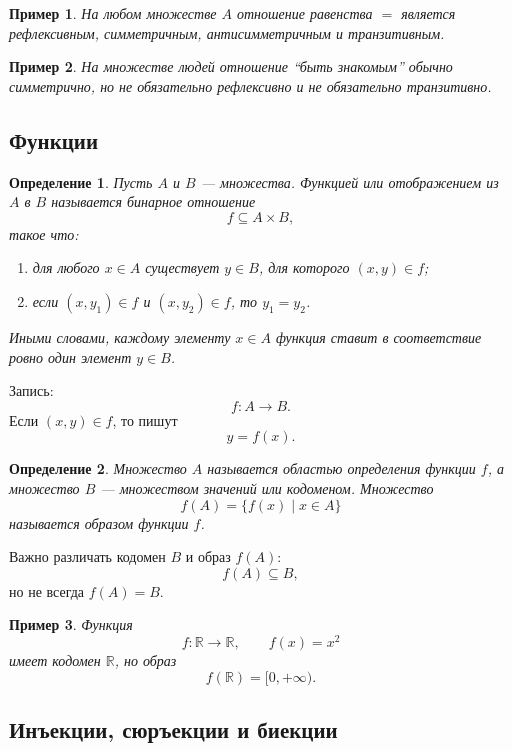 \documentclass[12pt,a4paper]{article}
\newtheorem{definition}{Определение}
\newtheorem{example}{Пример}
\begin{document}
\begin{example}
На любом множестве $A$ отношение равенства $=$ является рефлексивным, симметричным, антисимметричным и транзитивным.
\end{example}

\begin{example}
На множестве людей отношение ``быть знакомым'' обычно симметрично, но не обязательно рефлексивно и не обязательно транзитивно.
\end{example}

\subsection{Функции}

\begin{definition}
Пусть $A$ и $B$ --- множества. \emph{Функцией} или \emph{отображением}
из $A$ в $B$ называется бинарное отношение
\[
f\subseteq A\times B,
\]
такое что:

\begin{enumerate}
\item для любого $x\in A$ существует $y\in B$, для которого $(x,y)\in f$;
\item если $(x,y_1)\in f$ и $(x,y_2)\in f$, то $y_1=y_2$.
\end{enumerate}

Иными словами, каждому элементу $x\in A$ функция ставит в соответствие ровно один элемент $y\in B$.
\end{definition}

Запись:
\[
f:A\to B.
\]
Если $(x,y)\in f$, то пишут
\[
y=f(x).
\]

\begin{definition}
Множество $A$ называется \emph{областью определения} функции $f$, а множество $B$ --- \emph{множеством значений} или \emph{кодоменом}.
Множество
\[
f(A)=\{f(x)\mid x\in A\}
\]
называется \emph{образом} функции $f$.
\end{definition}

Важно различать кодомен $B$ и образ $f(A)$:
\[
f(A)\subseteq B,
\]
но не всегда $f(A)=B$.

\begin{example}
Функция
\[
f:\mathbb R\to\mathbb R,\qquad f(x)=x^2
\]
имеет кодомен $\mathbb R$, но образ
\[
f(\mathbb R)=[0,+\infty).
\]
\end{example}

\subsection{Инъекции, сюръекции и биекции}
\end{document}
